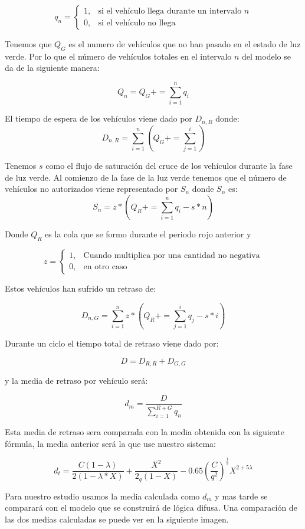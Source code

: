 $$ q_n = \begin{cases} 1, & \mbox{si el vehículo llega durante un intervalo } n \\ 0, & \mbox{si el vehículo no llega } \end{cases} $$


Tenemos que $Q_G$ es el numero de vehículos que no han pasado en el estado de luz verde. Por lo que el número de vehículos totales en el intervalo $n$ del modelo se da de la siguiente manera:

$$Q_n=Q_G+=\sum_{i=1}^{n}q_i$$

El tiempo de espera de los vehículos viene dado por $D_{n,R}$ donde:\\

$$D_{n,R}=\sum_{i=1}^{n}(Q_G+=\sum_{j=1}^{i})$$

Tenemos $s$ como el flujo de saturación del cruce de los vehículos durante la fase de luz verde. Al comienzo de la fase de la luz verde tenemos que el número de vehículos no autorizados viene representado por $S_n$ donde $S_n$ es:\\

$$S_n=z*(Q_R+=\sum_{i=1}^{n}q_i-s*n)$$

Donde $Q_R$ es la cola que se formo durante el periodo rojo anterior y 

$$ z = \begin{cases} 1, & \mbox{Cuando multiplica por una cantidad no negativa} \\ 0, & \mbox{en otro caso } \end{cases} $$

Estos vehículos han sufrido un retraso de:

$$D_{n,G}=\sum_{i=1}^{n}z*(Q_R+=\sum_{j=1}^{i}q_j-s*i)$$

Durante un ciclo el tiempo total de retraso viene dado por:

$$D=D_{R,R}+D_{G,G}$$

y la media de retraso por vehículo será:

$$d_m=\frac{D}{\sum_{i=1}^{R+G}q_n}$$

Esta media de retraso sera comparada con la media obtenida con la siguiente fórmula, la media anterior será la que use nuestro sistema:

$$d_t=\frac{C(1-\lambda)}{2(1-\lambda*X)}+\frac{X^2}{2_q(1-X)}-0.65(\frac{C}{q^2})^{\frac{1}{3}}X^{2+5\lambda}$$

Para nuestro estudio usamos la media calculada como $d_m$ y mas tarde se comparará con el modelo que se construirá de lógica difusa. Una comparación de las dos medias calculadas se puede ver en la siguiente imagen.

